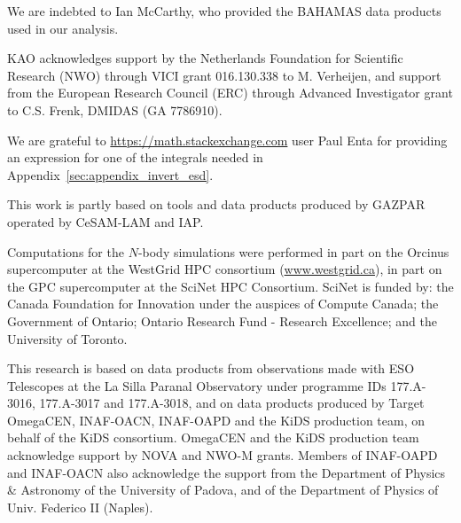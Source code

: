 \documentclass[usenatbib]{mnras}
\begin{document}
We are indebted to Ian McCarthy, who provided the BAHAMAS data products used in our analysis.

KAO acknowledges support by the Netherlands Foundation for Scientific Research (NWO) through VICI grant 016.130.338 to M. Verheijen, and support from the European Research Council (ERC) through Advanced Investigator grant to C.S. Frenk, DMIDAS (GA 7786910).

We are grateful to \url{https://math.stackexchange.com} user Paul Enta for providing an expression for one of the integrals needed in Appendix~\ref{sec:appendix_invert_esd}.

This work is partly based on tools and data products produced by GAZPAR operated by CeSAM-LAM and IAP.


Computations for the $N$-body simulations were performed in part on the Orcinus supercomputer at the WestGrid HPC consortium (\url{www.westgrid.ca}), in part on the GPC supercomputer at the SciNet HPC Consortium. SciNet is funded by: the Canada Foundation for Innovation under the auspices of Compute Canada; the Government of Ontario; Ontario Research Fund - Research Excellence; and the University of Toronto.

This research is based on data products from observations made with ESO Telescopes at the La Silla Paranal Observatory under programme IDs 177.A-3016, 177.A-3017 and 177.A-3018, and on data products produced by Target OmegaCEN, INAF-OACN, INAF-OAPD and the KiDS production team, on behalf of the KiDS consortium. OmegaCEN and the KiDS production team acknowledge support by NOVA and NWO-M grants. Members of INAF-OAPD and INAF-OACN also acknowledge the support from the Department of Physics \& Astronomy of the University of Padova, and of the Department of Physics of Univ. Federico II (Naples).
\end{document}
